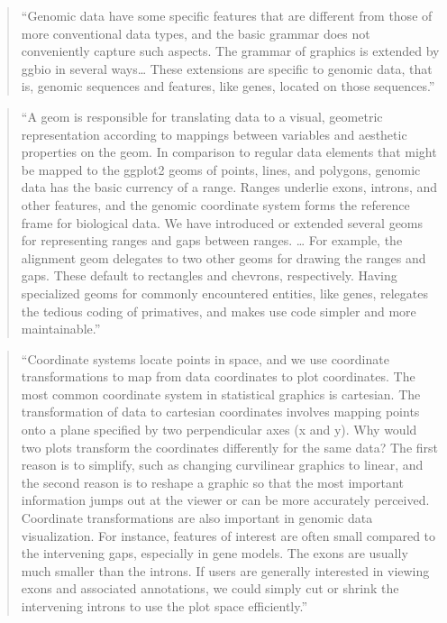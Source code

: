 \documentclass[]{tufte-book}
\begin{document}
\begin{quote}
``Genomic data have some specific features that are different from those of
more conventional data types, and the basic grammar does not conveniently
capture such aspects. The grammar of graphics is extended by ggbio in
several ways\ldots{} These extensions are specific to genomic data, that is,
genomic sequences and features, like genes, located on those sequences.''
\citep{yin2012ggbio}
\end{quote}

\begin{quote}
``A geom is responsible for translating data to a visual, geometric
representation according to mappings between variables and aesthetic
properties on the geom. In comparison to regular data elements that
might be mapped to the ggplot2 geoms of points, lines, and polygons,
genomic data has the basic currency of a range. Ranges underlie exons,
introns, and other features, and the genomic coordinate system forms
the reference frame for biological data. We have introduced or extended
several geoms for representing ranges and gaps between ranges. \ldots{}
For example, the alignment geom delegates to two other geoms for drawing
the ranges and gaps. These default to rectangles and chevrons, respectively.
Having specialized geoms for commonly encountered entities, like genes,
relegates the tedious coding of primatives, and makes use code simpler
and more maintainable.'' \citep{yin2012ggbio}
\end{quote}

\begin{quote}
``Coordinate systems locate points in space, and we use coordinate
transformations to map from data coordinates to plot coordinates. The
most common coordinate system in statistical graphics is cartesian.
The transformation of data to cartesian coordinates involves mapping
points onto a plane specified by two perpendicular axes (x and y).
Why would two plots transform the coordinates differently for the same data?
The first reason is to simplify, such as changing curvilinear graphics to
linear, and the second reason is to reshape a graphic so that the most
important information jumps out at the viewer or can be more accurately
perceived. Coordinate transformations are also important in genomic data
visualization. For instance, features of interest are often small
compared to the intervening gaps, especially in gene models. The exons
are usually much smaller than the introns. If users are generally interested
in viewing exons and associated annotations, we could simply cut or
shrink the intervening introns to use the plot space efficiently.'' \citep{yin2012ggbio}
\end{quote}
\end{document}

